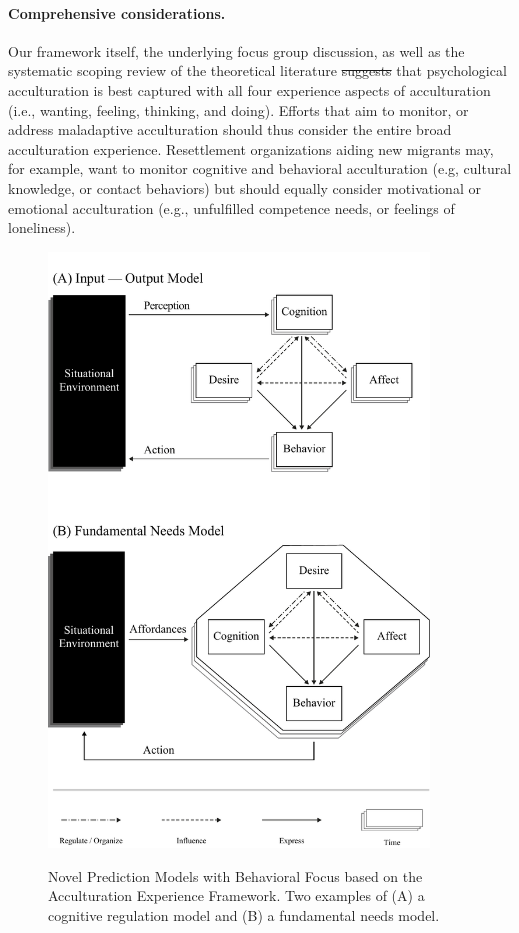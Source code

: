 \documentclass[man, 12pt, a4paper, mask]{apa7}
\providecommand{\DIFaddtex}[1]{{\protect\color{blue}\uwave{#1}}} %
\providecommand{\DIFdeltex}[1]{{\protect\color{red}\sout{#1}}}                      %
\providecommand{\DIFaddbegin}{} %
\providecommand{\DIFaddend}{} %
\providecommand{\DIFdelbegin}{} %
\providecommand{\DIFdelend}{} %
\providecommand{\DIFadd}[1]{\texorpdfstring{\DIFaddtex{#1}}{#1}} %
\providecommand{\DIFdel}[1]{\texorpdfstring{\DIFdeltex{#1}}{}} %
\newcommand{\DIFscaledelfig}{0.5}
\newlength{\DIFdelgraphicswidth} %
\newlength{\DIFdelgraphicsheight} %
\newcommand{\DIFaddincludegraphics}[2][]{{\color{blue}\fbox{\DIFOincludegraphics[#1]{#2}}}} %
\newcommand{\DIFdelincludegraphics}[2][]{%
\sbox{\DIFdelgraphicsbox}{\DIFOincludegraphics[#1]{#2}}%
\settoboxwidth{\DIFdelgraphicswidth}{\DIFdelgraphicsbox} %
\settoboxtotalheight{\DIFdelgraphicsheight}{\DIFdelgraphicsbox} %
\scalebox{\DIFscaledelfig}{%
\parbox[b]{\DIFdelgraphicswidth}{\usebox{\DIFdelgraphicsbox}\\[-\baselineskip] \rule{\DIFdelgraphicswidth}{0em}}\llap{\resizebox{\DIFdelgraphicswidth}{\DIFdelgraphicsheight}{%
\setlength{\unitlength}{\DIFdelgraphicswidth}%
\begin{picture}(1,1)%
\thicklines\linethickness{2pt} %
{\color[rgb]{1,0,0}\put(0,0){\framebox(1,1){}}}%
{\color[rgb]{1,0,0}\put(0,0){\line( 1,1){1}}}%
{\color[rgb]{1,0,0}\put(0,1){\line(1,-1){1}}}%
\end{picture}%
}\hspace*{3pt}}} %
} %
\DeclareRobustCommand{\DIFaddbegin}{\DIFOaddbegin \let\includegraphics\DIFaddincludegraphics} %
\DeclareRobustCommand{\DIFaddend}{\DIFOaddend \let\includegraphics\DIFOincludegraphics} %
\DeclareRobustCommand{\DIFdelbegin}{\DIFOdelbegin \let\includegraphics\DIFdelincludegraphics} %
\DeclareRobustCommand{\DIFdelend}{\DIFOaddend \let\includegraphics\DIFOincludegraphics} %
\begin{document}
\paragraph{Comprehensive considerations.} Our framework itself, the underlying focus group discussion, as well as the systematic scoping review of the theoretical literature \DIFdelbegin \DIFdel{suggests }\DIFdelend \DIFaddbegin \DIFadd{suggest }\DIFaddend that psychological acculturation is best captured with all four experience aspects of acculturation (i.e., wanting, feeling, thinking, and doing). Efforts that aim to monitor, or address maladaptive acculturation should thus consider the entire broad acculturation experience. Resettlement organizations aiding new migrants may, for example, want to monitor cognitive and behavioral acculturation (e.g, cultural knowledge, or contact behaviors) but should equally consider motivational or emotional acculturation (e.g., unfulfilled competence needs, or feelings of loneliness). 



\begin{figure}[ht!]
\centering
    \caption{Novel Prediction Models with Behavioral Focus based on the Acculturation Experience Framework. Two examples of (A) a cognitive regulation model and (B) a fundamental needs model.}
\includegraphics[width=0.9\textwidth]{Figures/NovelPredictionsBehaviorTime.pdf}
\label{fig:NovelModels}
\end{figure}
\end{document}
